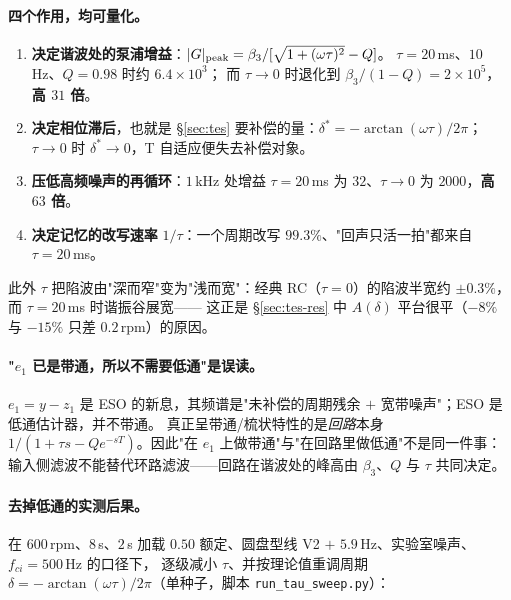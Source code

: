 \documentclass[11pt,a4paper]{article}
\theoremstyle{remark}\newtheorem{remark}{注}
\begin{document}
\paragraph{四个作用，均可量化。}
\begin{enumerate}
  \item \textbf{决定谐波处的泵浦增益}：$|G|_{\rm peak}=\beta_3/[\sqrt{1+(\omega\tau)^2}-Q]$。
        $\tau=20$\,ms、$10$\,Hz、$Q=0.98$ 时约 $6.4\times10^{3}$；
        而 $\tau\to0$ 时退化到 $\beta_3/(1-Q)=2\times10^{5}$，\textbf{高 $31$ 倍}。
  \item \textbf{决定相位滞后}，也就是 §\ref{sec:tes} 要补偿的量：$\delta^{*}=-\arctan(\omega\tau)/2\pi$；
        $\tau\to0$ 时 $\delta^{*}\to0$，T 自适应便失去补偿对象。
  \item \textbf{压低高频噪声的再循环}：$1$\,kHz 处增益 $\tau=20$\,ms 为 $32$、$\tau\to0$ 为 $2000$，\textbf{高 $63$ 倍}。
  \item \textbf{决定记忆的改写速率} $1/\tau$：一个周期改写 $99.3\%$、"回声只活一拍"都来自 $\tau=20$\,ms。
\end{enumerate}
此外 $\tau$ 把陷波由"深而窄"变为"浅而宽"：经典 RC（$\tau=0$）的陷波半宽约 $\pm0.3\%$，而 $\tau=20$\,ms 时谐振谷展宽——
这正是 §\ref{sec:tes-res} 中 $A(\delta)$ 平台很平（$-8\%$ 与 $-15\%$ 只差 $0.2$\,rpm）的原因。

\paragraph{"$e_1$ 已是带通，所以不需要低通"是误读。}
$e_1=y-z_1$ 是 ESO 的新息，其频谱是"未补偿的周期残余 $+$ 宽带噪声"；ESO 是低通估计器，并不带通。
真正呈带通/梳状特性的是\emph{回路}本身 $1/(1+\tau s-Qe^{-sT})$。因此"在 $e_1$ 上做带通"与"在回路里做低通"不是同一件事：
输入侧滤波不能替代环路滤波——回路在谐波处的峰高由 $\beta_3$、$Q$ 与 $\tau$ 共同决定。

\paragraph{去掉低通的实测后果。}
在 600\,rpm、$8$\,s、$2$\,s 加载 $0.50$ 额定、圆盘型线 V2 $+$ $5.9$\,Hz、实验室噪声、$f_{ci}=500$\,Hz 的口径下，
逐级减小 $\tau$、并按理论值重调周期 $\delta=-\arctan(\omega\tau)/2\pi$（单种子，脚本 \texttt{run\_tau\_sweep.py}）：
\end{document}
